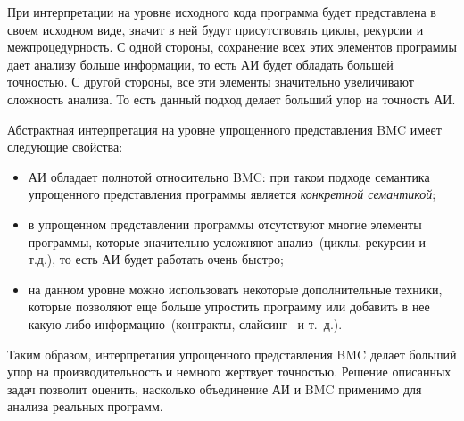 При интерпретации на уровне исходного кода программа будет представлена в своем
исходном виде, значит в ней будут присутствовать циклы, рекурсии и 
межпроцедурность. С одной стороны, сохранение всех этих элементов программы 
дает анализу больше информации, то есть АИ будет обладать большей точностью. С 
другой стороны, все эти элементы значительно увеличивают сложность анализа. То 
есть данный подход делает больший упор на точность АИ.

Абстрактная интерпретация на уровне упрощенного представления BMC имеет 
следующие свойства:
\begin{itemize}
\item АИ обладает полнотой относительно BMC: при таком подходе семантика
упрощенного представления программы является \emph{конкретной семантикой};
\item в упрощенном представлении программы отсутствуют многие элементы 
программы, которые значительно усложняют анализ~(циклы, рекурсии и т.д.), то 
есть АИ будет работать очень быстро;
\item на данном уровне можно использовать некоторые дополнительные техники,
которые позволяют еще больше упростить программу или добавить в нее какую-либо
информацию~(контракты, слайсинг~\cite{slicing} и т.~д.).
\end{itemize}

Таким образом, интерпретация упрощенного представления BMC делает больший упор 
на производительность и немного жертвует точностью. Решение описанных задач 
позволит оценить, насколько объединение АИ и BMC применимо для анализа реальных
программ.

